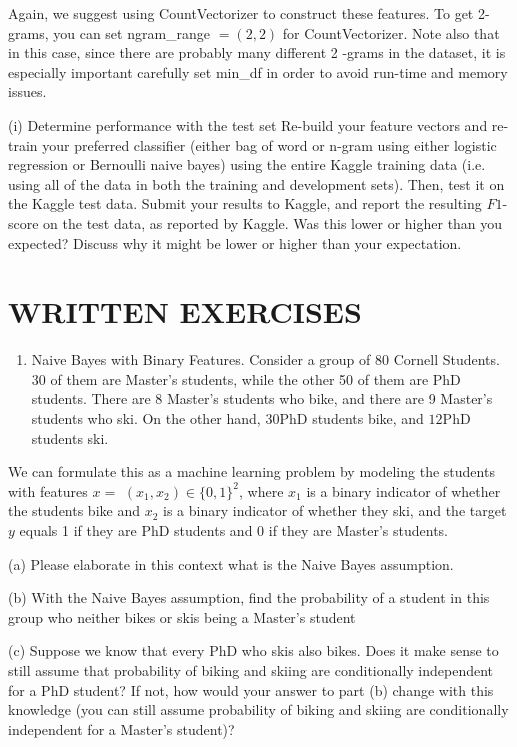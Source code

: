 \documentclass[10pt]{article}
\begin{document}
Again, we suggest using CountVectorizer to construct these features. To get 2-grams, you can set ngram\_range $=(2,2)$ for CountVectorizer. Note also that in this case, since there are probably many different 2 -grams in the dataset, it is especially important carefully set min\_df in order to avoid run-time and memory issues.

(i) Determine performance with the test set Re-build your feature vectors and re-train your preferred classifier (either bag of word or n-gram using either logistic regression or Bernoulli naive bayes) using the entire Kaggle training data (i.e. using all of the data in both the training and development sets). Then, test it on the Kaggle test data. Submit your results to Kaggle, and report the resulting $F 1$-score on the test data, as reported by Kaggle. Was this lower or higher than you expected? Discuss why it might be lower or higher than your expectation.

\section{WRITTEN EXERCISES}
\begin{enumerate}
  \item Naive Bayes with Binary Features. Consider a group of 80 Cornell Students. 30 of them are Master's students, while the other 50 of them are PhD students. There are 8 Master's students who bike, and there are 9 Master's students who ski. On the other hand, $30 \mathrm{PhD}$ students bike, and $12 \mathrm{PhD}$ students ski.
\end{enumerate}

We can formulate this as a machine learning problem by modeling the students with features $x=$ $\left(x_{1}, x_{2}\right) \in\{0,1\}^{2}$, where $x_{1}$ is a binary indicator of whether the students bike and $x_{2}$ is a binary indicator of whether they ski, and the target $y$ equals 1 if they are $\mathrm{PhD}$ students and 0 if they are Master's students.

(a) Please elaborate in this context what is the Naive Bayes assumption.

(b) With the Naive Bayes assumption, find the probability of a student in this group who neither bikes or skis being a Master's student

(c) Suppose we know that every $\mathrm{PhD}$ who skis also bikes. Does it make sense to still assume that probability of biking and skiing are conditionally independent for a PhD student? If not, how would your answer to part (b) change with this knowledge (you can still assume probability of biking and skiing are conditionally independent for a Master's student)?
\end{document}
